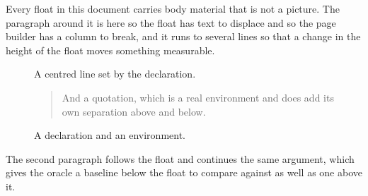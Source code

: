 \documentclass{article}
\begin{document}
Every float in this document carries body material that is not a
picture. The paragraph around it is here so the float has text to displace and
so the page builder has a column to break, and it runs to several lines so that
a change in the height of the float moves something measurable.

\begin{figure}[h]
\centering
A centred line set by the declaration.

\begin{quote}
And a quotation, which is a real environment and does add its own
separation above and below.
\end{quote}
\caption{A declaration and an environment.}
\end{figure}

The second paragraph follows the float and continues the same
argument, which gives the oracle a baseline below the float to compare against
as well as one above it.
\end{document}
